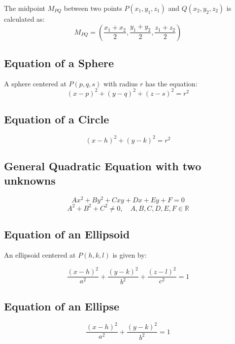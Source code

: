 \documentclass[a4paper,12pt,openany]{book}
\newcommand{\R}{\mathbb{R}}
\begin{document}
The midpoint \(M_{PQ}\) between two points \( P(x_1, y_1, z_1) \) and \( Q(x_2, y_2, z_2) \) is calculated as:
\begin{equation}\label{Midpoint Formula}
    M_{PQ} = \left(\dfrac{x_1 + x_2}{2}, \dfrac{y_1 + y_2}{2}, \dfrac{z_1 + z_2}{2}\right)
\end{equation}

\subsection{Equation of a Sphere}

A sphere centered at \(P(p, q, s)\) with radius \( r \) has the equation:
\begin{equation}\label{Equation of a Sphere}
    (x - p)^2 + (y - q)^2 + (z - s)^2 = r^2
\end{equation}

\subsection{Equation of a Circle}
\begin{equation}\label{Equation of a Circle}
    (x-h)^2 + (y-k)^2 = r^2
\end{equation}

\subsection{General Quadratic Equation with two unknowns}
\begin{equation}\label{General Quadratic Equation}
    Ax^2 + By^2 + Cxy + Dx + Ey + F = 0
\end{equation}
\[
    A^2 + B^2 + C^2 \neq 0, \quad A, B, C, D, E, F \in \R
\]
\subsection{Equation of an Ellipsoid}

An ellipsoid centered at \(P(h, k, l)\) is given by:

\begin{equation}\label{Equation of an Ellipsoid}
    \dfrac{(x-h)^2}{a^2} +  
    \dfrac{(y-k)^2}{b^2} + 
    \dfrac{(z-l)^2}{c^2} = 1
\end{equation}

\subsection{Equation of an Ellipse}
\begin{equation}\label{Equation of an Ellipse}
    \dfrac{(x-h)^2}{a^2} + \dfrac{(y-k)^2}{b^2} = 1
\end{equation}
\end{document}
